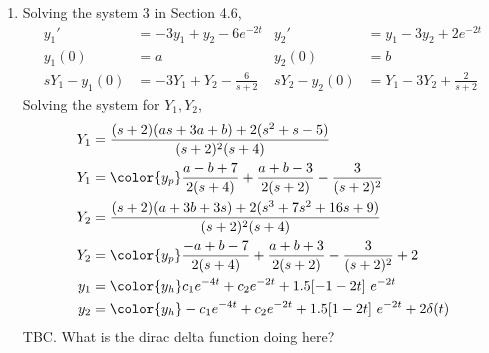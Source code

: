\begin{enumerate}
\begin{enumerate}
              \item Solving the system $ 3 $ in Section 4.6,
                    \begin{align}
                        y_1'          & = -3y_1 + y_2 - 6e^{-2t}     &
                        y_2'          & = y_1 - 3y_2 + 2e^{-2t}        \\
                        y_1(0)        & = a                          &
                        y_2(0)        & = b                            \\
                        sY_1 - y_1(0) & = -3Y_1 + Y_2 -\frac{6}{s+2} &
                        sY_2 - y_2(0) & = Y_1 - 3Y_2 + \frac{2}{s+2}
                    \end{align}
                    Solving the system for $ Y_1, Y_2 $,
                    \begin{align}
                        Y_1 & = \frac{(s+2)(as + 3a + b) + 2(s^2 + s - 5)}
                        {(s+2)^2(s+4)}                                     \\
                        Y_1 & = \color{y_p} \frac{a-b+7}{2(s+4)}
                        + \frac{a+b-3}{2(s+2)}
                        - \frac{3}{(s+2)^2}                                \\
                        Y_2 & = \frac{(s+2)(a + 3b + 3s) +
                        2(s^3 + 7s^2 + 16s + 9)}{(s+2)^2(s+4)}             \\
                        Y_2 & = \color{y_p} \frac{-a + b - 7}{2(s+4)}
                        + \frac{a+b+3}{2(s+2)} - \frac{3}{(s+2)^2} + 2     \\
                        y_1 & = \color{y_h} c_1 e^{-4t} + c_2 e^{-2t}
                        + 1.5[-1 - 2t]\ e^{-2t}                            \\
                        y_2 & = \color{y_h} -c_1 e^{-4t} + c_2 e^{-2t}
                        + 1.5[1 - 2t]\ e^{-2t} + 2\delta(t)
                    \end{align}
                    TBC. What is the dirac delta function doing here?
          \end{enumerate}


\end{enumerate}
